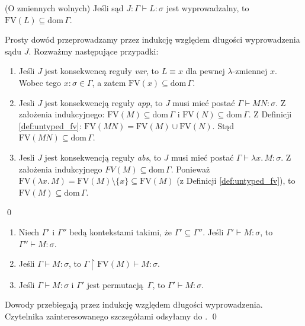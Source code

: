 \begin{lemat}(O zmiennych wolnych)\label{thm:fv}
  Jeśli sąd \(J: \Gamma \vdash L:\sigma\) jest wyprowadzalny, to \(\mathrm{FV}(L)\subseteq \mathrm{dom}\,\Gamma\).
\end{lemat}
\begin{dowod}
  Prosty dowód przeprowadzamy przez indukcję względem długości wyprowadzenia sądu \(J\). Rozważmy następujące przypadki:
  \begin{enumerate}[label=(\alph*)]
    \setlength\itemsep{0em}
    \item Jeśli \(J\) jest konsekwencą reguły \emph{var}, to \(L\equiv x\) dla pewnej \(\lambda\)-zmiennej \(x\). Wobec tego \(x:\sigma\in\Gamma\), a zatem \(\mathrm{FV}(x)\subseteq\mathrm{dom}\,\Gamma\).
    \item Jesli \(J\) jest konsekwencją reguły \emph{app}, to \(J\) musi mieć postać \(\Gamma\vdash MN:\sigma\). Z założenia indukcyjnego: \(\mathrm{FV}(M)\subseteq \mathrm{dom}\,\Gamma\) i  \(\mathrm{FV}(N)\subseteq \mathrm{dom}\,\Gamma\). Z Definicji \ref{def:untyped_fv}: \(\mathrm{FV}(MN)=\mathrm{FV}(M)\cup\mathrm{FV}(N)\). Stąd \(\mathrm{FV}(MN)\subseteq \mathrm{dom}\,\Gamma\).
    \item Jesli \(J\) jest konsekwencją reguły \emph{abs}, to \(J\) musi mieć postać \(\Gamma\vdash \lambda x.\,M:\sigma\). Z założenia indukcyjnego \(FV(M)\subseteq\mathrm{dom}\,\Gamma\). Ponieważ \(\mathrm{FV}(\lambda x.\,M)=\mathrm{FV}(M)\setminus\{x\}\subseteq\mathrm{FV}(M)\) (z Definicji \ref{def:untyped_fv}), to \(\mathrm{FV}(M)\subseteq\mathrm{dom}\,\Gamma\). 
  \end{enumerate}  
  \qed
\end{dowod}

\begin{lemat}\label{thm:permutation_simple}
  \begin{enumerate}[label=(\arabic*), ref=(\arabic*)]
    \setlength\itemsep{0em}
    \item Niech \(\Gamma'\) i \(\Gamma''\) bedą kontekstami takimi, że \(\Gamma' \subseteq \Gamma''\). Jeśli \(\Gamma'\vdash M:\sigma\), to \(\Gamma''\vdash M:\sigma\).\label{thm:permutation_1}
    \item Jeśli \(\Gamma\vdash M:\sigma\), to \(\Gamma \upharpoonright \mathrm{FV}(M)\vdash M:\sigma\).\label{thm:permutation_2}
    \item Jeśli \(\Gamma\vdash M:\sigma\) i \(\Gamma'\) jest permutacją \(\Gamma\), to \(\Gamma'\vdash M:\sigma\).\label{thm:permutation_3}
  \end{enumerate}
\end{lemat}
\begin{dowod}
  Dowody przebiegają przez indukcję względem długości wyprowadzenia. Czytelnika zainteresowanego szczegółami odsyłamy do \cite[Tw. 3.1.7]{Barendregt_1992}. 
  \qed
\end{dowod}

